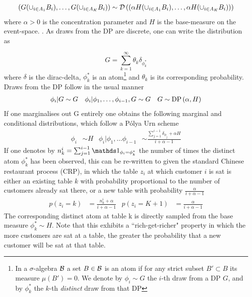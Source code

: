 \begin{align}
\left(
    G(\cup_{i \in A_1} B_i),
    \ldots,
    G(\cup_{i \in A_K} B_i)
\right)
\sim
\mathcal{D} \left( {
    \left(
        \alpha H(\cup_{i \in A_1} B_i),
        \ldots,
        \alpha H(\cup_{i \in A_K} B_i)
    \right)
} \right)
\end{align}
where $\alpha > 0$ is the concentration parameter and $H$ is the base-measure on the event-space. . As draws from the DP are discrete, one can write the distribution as


\begin{equation}
G = \sum_{k=1}^{\infty} \theta_k \delta_{\phi^*_k} \label{eqn:ch1:dp-as-weighted-atoms}
\end{equation}
where $\delta$ is the dirac-delta, $\phi^*_k$ is an atom\footnote{In a $\sigma$-algebra $\mathcal{B}$ a set $B \in \mathcal{B}$ is an atom if for any strict subset $B' \subset B$ its measure $\mu(B') = 0$. We denote by $\phi_i \sim G$ the $i$-th draw from a DP $G$, and by $\phi^*_k$ the $k$-th \emph{distinct} draw from that DP} and $\theta_k$ is its corresponding probability. Draws from the DP follow in the usual manner
\begin{align}
\phi_i|G & \sim G &
\phi_i|\phi_1,\ldots,\phi_{i-1},G & \sim G &
G \sim \text{DP} \left( {\alpha, H} \right)
\end{align}
If one marginalises out G entirely one obtains the following marginal and conditional distributions, which follow a P\'olya Urn scheme\cite{Blackwell1973}
\begin{align}
\phi_i &
\sim H &
\phi_i | \phi_1, \ldots \phi_{i-1} &
\sim \frac{\sum_{j=1}^{i-1} \delta_{\phi_j} + \alpha H}{i + \alpha - 1}
\end{align}
If one denotes by $n^i_k = \sum_{j=1}^{i-1} \one_{\phi_i = \phi^*_k}$ the number of times the distinct atom $\phi^*_k$ has been observed, this can be re-written to given the standard Chinese restaurant process (CRP)\cite{Neal2000}, in which the table $z_i$ at which customer $i$ is sat is either an existing table $k$ with probability proportional to the number of customers already sat there, or a new table with probability $\frac{\alpha}{i + \alpha - 1}$
\begin{align}
p(z_i = k) & = \frac{n^i_k + \alpha}{i + \alpha - 1} &
p(z_i = K + 1) & = \frac{\alpha}{i + \alpha - 1}
\end{align}
The corresponding distinct atom at table k is directly sampled from the base measure $\phi^*_k \sim H$. Note that this exhibits a ``rich-get-richer" property in which the more customers are sat at a table, the greater the probability that a new customer will be sat at that table.

